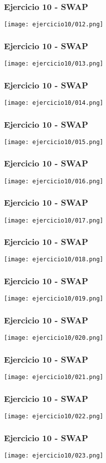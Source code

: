 \documentclass{beamer}
\begin{document}
\begin{frame}
\frametitle{Ejercicio 10 - SWAP}
\texttt{[image: ejercicio10/012.png]}
\end{frame}

\begin{frame}
\frametitle{Ejercicio 10 - SWAP}
\texttt{[image: ejercicio10/013.png]}
\end{frame}

\begin{frame}
\frametitle{Ejercicio 10 - SWAP}
\texttt{[image: ejercicio10/014.png]}
\end{frame}

\begin{frame}
\frametitle{Ejercicio 10 - SWAP}
\texttt{[image: ejercicio10/015.png]}
\end{frame}

\begin{frame}
\frametitle{Ejercicio 10 - SWAP}
\texttt{[image: ejercicio10/016.png]}
\end{frame}

\begin{frame}
\frametitle{Ejercicio 10 - SWAP}
\texttt{[image: ejercicio10/017.png]}
\end{frame}

\begin{frame}
\frametitle{Ejercicio 10 - SWAP}
\texttt{[image: ejercicio10/018.png]}
\end{frame}

\begin{frame}
\frametitle{Ejercicio 10 - SWAP}
\texttt{[image: ejercicio10/019.png]}
\end{frame}

\begin{frame}
\frametitle{Ejercicio 10 - SWAP}
\texttt{[image: ejercicio10/020.png]}
\end{frame}

\begin{frame}
\frametitle{Ejercicio 10 - SWAP}
\texttt{[image: ejercicio10/021.png]}
\end{frame}

\begin{frame}
\frametitle{Ejercicio 10 - SWAP}
\texttt{[image: ejercicio10/022.png]}
\end{frame}

\begin{frame}
\frametitle{Ejercicio 10 - SWAP}
\texttt{[image: ejercicio10/023.png]}
\end{frame}
\end{document}
